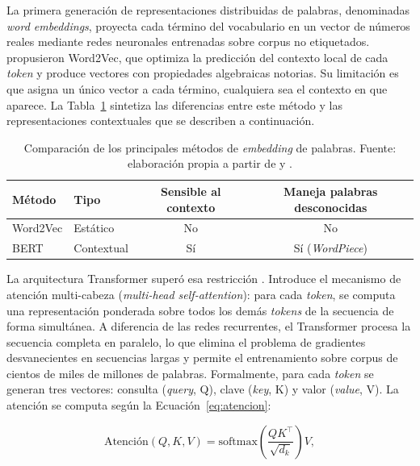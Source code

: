 La primera generación de representaciones distribuidas de palabras, denominadas \textit{word embeddings}, proyecta cada término del vocabulario en un vector de números reales mediante redes neuronales entrenadas sobre corpus no etiquetados. \textcite{MikolovEtAl2013} propusieron Word2Vec, que optimiza la predicción del contexto local de cada \textit{token} y produce vectores con propiedades algebraicas notorias. Su limitación es que asigna un único vector a cada término, cualquiera sea el contexto en que aparece. La Tabla~\ref{tab:embeddings} sintetiza las diferencias entre este método y las representaciones contextuales que se describen a continuación.

\begin{table}[t]
  \centering
  \caption{Comparación de los principales métodos de \textit{embedding} de palabras. Fuente: elaboración propia a partir de \textcite{MikolovEtAl2013} y \textcite{DevlinEtAl2019}.}
  \label{tab:embeddings}
  \begin{tabular}{l l c c}
    \hline
    \textbf{Método} & \textbf{Tipo} & \textbf{Sensible al contexto} & \textbf{Maneja palabras desconocidas} \\
    \hline
    Word2Vec & Estático & No & No \\
    BERT & Contextual & Sí & Sí (\textit{WordPiece}) \\
    \hline
  \end{tabular}
\end{table}

La arquitectura Transformer superó esa restricción \parencite{VaswaniEtAl2017}. Introduce el mecanismo de atención multi-cabeza (\textit{multi-head self-attention}): para cada \textit{token}, se computa una representación ponderada sobre todos los demás \textit{tokens} de la secuencia de forma simultánea. A diferencia de las redes recurrentes, el Transformer procesa la secuencia completa en paralelo, lo que elimina el problema de gradientes desvanecientes en secuencias largas y permite el entrenamiento sobre corpus de cientos de miles de millones de palabras. Formalmente, para cada \textit{token} se generan tres vectores: consulta (\textit{query}, Q), clave (\textit{key}, K) y valor (\textit{value}, V). La atención se computa según la Ecuación~\ref{eq:atencion}:

\begin{equation}
  \text{Atención}(Q, K, V) = \mathrm{softmax}\!\left(\frac{Q K^{\top}}{\sqrt{d_k}}\right) V,
  \label{eq:atencion}
\end{equation}

